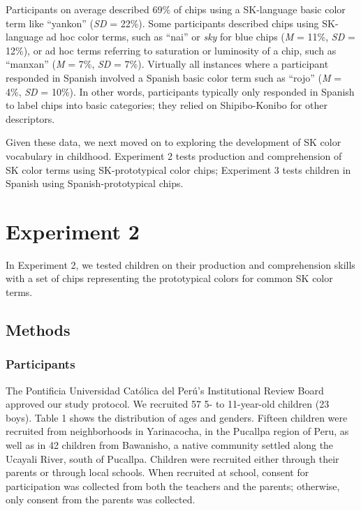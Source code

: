 \documentclass[floatsintext,man]{apa6}
\theoremstyle{definition}
\theoremstyle{definition}
\theoremstyle{definition}
\theoremstyle{remark}
\begin{document}
Participants on average described 69\% of chips using a SK-language
basic color term like \enquote{yankon} (\emph{SD} = 22\%). Some
participants described chips using SK-language ad hoc color terms, such
as \enquote{nai} or \emph{sky} for blue chips (\emph{M} = 11\%,
\emph{SD} = 12\%), or ad hoc terms referring to saturation or luminosity
of a chip, such as \enquote{manxan} (\emph{M} = 7\%, \emph{SD} = 7\%).
Virtually all instances where a participant responded in Spanish
involved a Spanish basic color term such as \enquote{rojo} (\emph{M} =
4\%, \emph{SD} = 10\%). In other words, participants typically only
responded in Spanish to label chips into basic categories; they relied
on Shipibo-Konibo for other descriptors.

Given these data, we next moved on to exploring the development of SK
color vocabulary in childhood. Experiment 2 tests production and
comprehension of SK color terms using SK-prototypical color chips;
Experiment 3 tests children in Spanish using Spanish-prototypical chips.

\section{Experiment 2}\label{experiment-2}

In Experiment 2, we tested children on their production and
comprehension skills with a set of chips representing the prototypical
colors for common SK color terms.

\subsection{Methods}\label{methods-1}

\subsubsection{Participants}\label{participants-1}

The Pontificia Universidad Católica del Perú's Institutional Review
Board approved our study protocol. We recruited 57 5- to 11-year-old
children (23 boys). Table 1 shows the distribution of ages and genders.
Fifteen children were recruited from neighborhoods in Yarinacocha, in
the Pucallpa region of Peru, as well as in 42 children from Bawanisho, a
native community settled along the Ucayali River, south of Pucallpa.
Children were recruited either through their parents or through local
schools. When recruited at school, consent for participation was
collected from both the teachers and the parents; otherwise, only
consent from the parents was collected.
\end{document}
